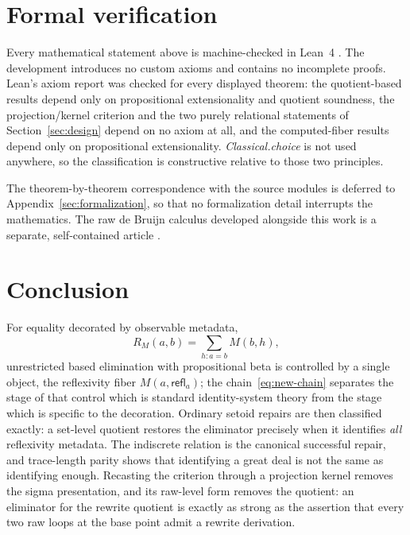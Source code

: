 \documentclass[10pt,reqno]{amsart}
\newcommand{\refl}{\mathsf{refl}}
\begin{document}
\section{Formal verification}
\label{sec:verification}

Every mathematical statement above is machine-checked in Lean~4
\cite{deMouraUllrich2021,MetadataJSoftware2026,QuotientPathInductionSoftware2026}.
The development introduces no custom axioms and contains no incomplete proofs.
Lean's axiom report was checked for every displayed theorem: the quotient-based
results depend only on propositional extensionality and quotient soundness, the
projection/kernel criterion and the two purely relational statements of
Section~\ref{sec:design} depend on no axiom at all, and the computed-fiber
results depend only on propositional extensionality.  \emph{Classical.choice} is
not used anywhere, so the classification is constructive relative to those two
principles.

The theorem-by-theorem correspondence with the source modules is deferred to
Appendix~\ref{sec:formalization}, so that no formalization detail interrupts the
mathematics.  The raw de Bruijn calculus developed alongside this work is a
separate, self-contained article \cite{ScopedTraceCalculus2026}.

\section{Conclusion}
\label{sec:conclusion}

For equality decorated by observable metadata,
\[
                 R_M(a,b)=\sum_{h:a=b}M(b,h),
\]
unrestricted based elimination with propositional beta is controlled by a single
object, the reflexivity fiber \(M(a,\refl_a)\); the chain~\eqref{eq:new-chain}
separates the stage of that control which is standard identity-system theory
from the stage which is specific to the decoration.  Ordinary setoid repairs are
then classified exactly: a set-level quotient restores the eliminator precisely
when it identifies \emph{all} reflexivity metadata.  The indiscrete relation is
the canonical successful repair, and trace-length parity shows that identifying
a great deal is not the same as identifying enough.  Recasting the criterion
through a projection kernel removes the sigma presentation, and its raw-level
form removes the quotient: an eliminator for the rewrite quotient is exactly as
strong as the assertion that every two raw loops at the base point admit a
rewrite derivation.
\end{document}
